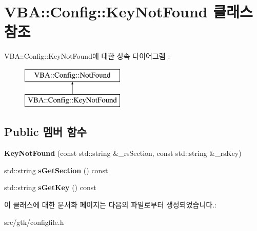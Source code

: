 \hypertarget{class_v_b_a_1_1_config_1_1_key_not_found}{}\section{V\+BA\+:\+:Config\+:\+:Key\+Not\+Found 클래스 참조}
\label{class_v_b_a_1_1_config_1_1_key_not_found}
V\+BA\+:\+:Config\+:\+:Key\+Not\+Found에 대한 상속 다이어그램 \+: \begin{figure}[H]
\begin{center}
\leavevmode
\includegraphics[height=2.000000cm]{class_v_b_a_1_1_config_1_1_key_not_found}
\end{center}
\end{figure}
\subsection*{Public 멤버 함수}
\begin{DoxyCompactItemize}
\item 
\mbox{\label{class_v_b_a_1_1_config_1_1_key_not_found_ad78272fbd8847d510dadd7bd8a7d9f03}} 
{\bfseries Key\+Not\+Found} (const std\+::string \&\+\_\+rs\+Section, const std\+::string \&\+\_\+rs\+Key)
\item 
\mbox{\label{class_v_b_a_1_1_config_1_1_key_not_found_af2eaee8322a1bed64dba70c801335916}} 
std\+::string {\bfseries s\+Get\+Section} () const
\item 
\mbox{\label{class_v_b_a_1_1_config_1_1_key_not_found_af9b10ec83d7e8af942de3abec286bda2}} 
std\+::string {\bfseries s\+Get\+Key} () const
\end{DoxyCompactItemize}


이 클래스에 대한 문서화 페이지는 다음의 파일로부터 생성되었습니다.\+:\begin{DoxyCompactItemize}
\item 
src/gtk/configfile.\+h\end{DoxyCompactItemize}
